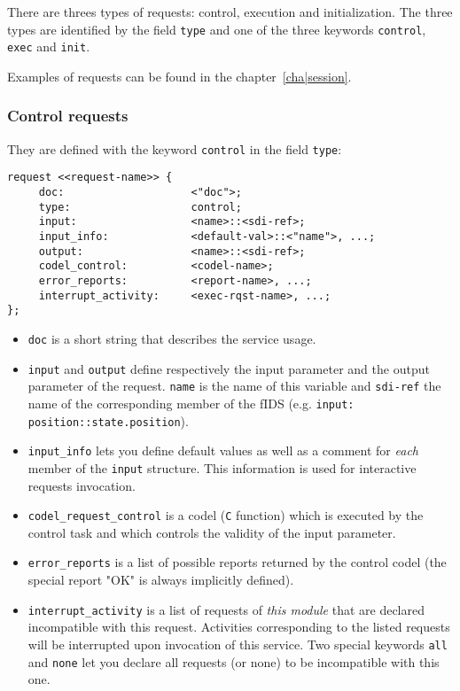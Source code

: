 There     are  threes   types of      requests:  control, execution   and
initialization. The three types are  identified  by the field {\tt  type}
and one of the three keywords {\tt control}, {\tt exec} and {\tt init}.

Examples of requests can be found in the chapter~\ref{cha|session}.

\subsubsection{Control requests}

They are defined with the keyword {\tt control} in the field {\tt type}:

\begin{center}\begin{cartouche}\small\begin{verbatim}
request <<request-name>> {
     doc:                    <"doc">;
     type:                   control;
     input:                  <name>::<sdi-ref>;
     input_info:             <default-val>::<"name">, ...;
     output:                 <name>::<sdi-ref>;
     codel_control:          <codel-name>;
     error_reports:          <report-name>, ...;
     interrupt_activity:     <exec-rqst-name>, ...;
};
\end{verbatim}\end{cartouche}\end{center}

\begin{itemize}
\item {\tt doc} is a short string that describes the service usage.

\item {\tt input} and {\tt output} define respectively the input
parameter and the output parameter of the request. {\tt name} is the name
of this variable and  {\tt sdi-ref} the name  of the corresponding member
of the fIDS (e.g. {\tt input: position::state.position}).

\item {\tt input\_info} lets you define default values as well as a
comment for {\em  each}   member  of  the  {\tt  input}  structure.  This
information is used for interactive  requests invocation.

\item {\tt codel\_request\_control} is a codel ({\tt C} function) which is
executed by the control task and which controls the validity of the input
parameter.

\item {\tt error\_reports} is a list of possible reports returned by the
control codel (the special report "OK" is always implicitly defined).

\item {\tt interrupt\_activity} is a list of requests of {\em this module}
that   are    declared   incompatible  with     this request.  Activities
corresponding to the listed requests will  be interrupted upon invocation
of this service.  Two special keywords {\tt  all} and {\tt none} let  you
declare all requests (or none) to be incompatible with this one.
\end{itemize}


